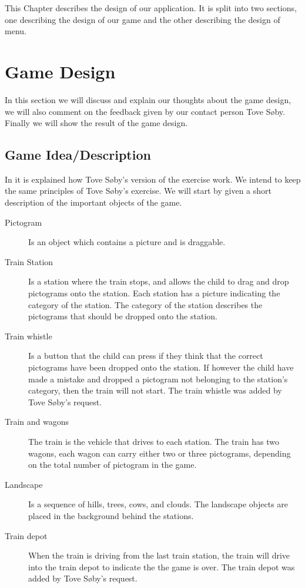 This Chapter describes the design of our application. It is split into two sections, one describing the design of our game and the other describing the design of menu.
\section{Game Design}
In this section we will discuss and explain our thoughts about the game design, we will also comment on the feedback given by our contact person Tove Søby. Finally we will show the result of the game design.
\subsection{Game Idea/Description}\label{sec:gameidea}
In  it is explained how Tove Søby's version of the exercise work. We intend to keep the same principles of Tove Søby's exercise. We will start by given a short description of the important objects of the game.
\begin{description}
\item[Pictogram] Is an object which contains a picture and is draggable.
\item[Train Station] Is a station where the train stops, and allows the child to drag and drop pictograms onto the station. Each station has a picture indicating the category of the station. The category of the station describes the pictograms that should be dropped onto the station.  

\item[Train whistle] Is a button that the child can press if they think that the correct pictograms have been dropped onto the station. If however the child have made a mistake and dropped a pictogram not belonging to the station's category, then the train will not start. The train whistle was added by Tove Søby's request.

\item[Train and wagons] The train is the vehicle that drives  to each station. The train has two wagons, each wagon can carry either two or three pictograms, depending on the total number of pictogram in the game.

\item[Landscape] Is a sequence of hills, trees, cows, and clouds. The landscape objects are placed in the background behind the stations.

\item[Train depot] When the train is driving from the last train station, the train will drive into the train depot to indicate the the game is over. The train depot was added by Tove Søby's request.
\end{description}
